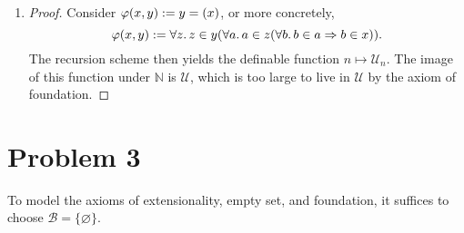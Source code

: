 \documentclass[a4paper]{article}
\newcommand{\N}{\mathbb{N}}
\let\P\relax
\newcommand{\P}{\mathcal{P}}
\newcommand{\U}{\mathcal{U}}
\newcommand{\B}{\mathcal{B}}
\newcommand{\impl}{\Rightarrow}
\let\iff\relax
\newcommand{\iff}{\Leftrightarrow}
\begin{document}
\begin{enumerate}
\begin{itemize}
\begin{proof}
      Let $x \in \U$.
      Then $x \in \U_{i}$ for some $i$, so $x \subseteq \U_{i}$ by Problem 1.
      Then it follows that $y \subseteq \U_{i}$ for each subset of $x$.
      In other words, each subset of $x$ lives in $\U_{s(i)}$.
      Thus, the set containing exactly these sets, i.e., $\P(x)$, is a subset of $\U_{s(i)}$, so the powerset lives in $\U_{s(s(i))}$.
    \end{proof}
  \item Axiom of union.
    \begin{proof}
      It suffices to show that the universe $\U$ is closed under union.
      Let $x \in \U$, then $x \in \U_{i}$ for some $i$.
      For any arbitrary $y \in \bigcup x$, the external axiom of union implies that there is a set $v$ such that $y \in v$ and $v \in x$.
      Thus, by transitivity, $v \in \U_{i}$ and (by transitivity again) $y \in \U_{i}$.
      In other words, $\bigcup x \subseteq \U_{i}$, so $\bigcup x \in \U_{s(i)}$.
    \end{proof}
  \item Axiom of infinity.
    \begin{proof}
      Note that $\N \in \P(\N) = V_{1}$.
    \end{proof}
  \item Axiom of foundation.
    \begin{proof}
      Let $x \in \U$ be a nonempty set.
      By the external axiom of foundation, there is a set $z \in x$ such that $x \cap z = \varnothing$, so it suffices to show that $z$ lives in the universe $\U$.
      This follows immediately from transitivity: since $x \in \U_{i}$ for some $i$ and $z \in x$ by assumption, we have that $z \in \U_{i}$.
    \end{proof}
  \end{itemize}
\item
  \begin{proof}
    Consider $\varphi(x,y) := y = \P(x)$, or more concretely,
    \[
      \varphi(x,y) := \forall z.\,%
      z \in y \iff%
      (\forall a.\, a \in z \iff (\forall b.\, b \in a \impl b \in x)).
    \]
    The recursion scheme then yields the definable function $n \mapsto \U_{n}$.
    The image of this function under $\N$ is $\U$, which is too large to live in $\U$ by the axiom of foundation.
  \end{proof}
\end{enumerate}

\section*{Problem 3}
To model the axioms of extensionality, empty set, and foundation, it suffices to choose $\B = \{\varnothing\}$.
\end{document}
